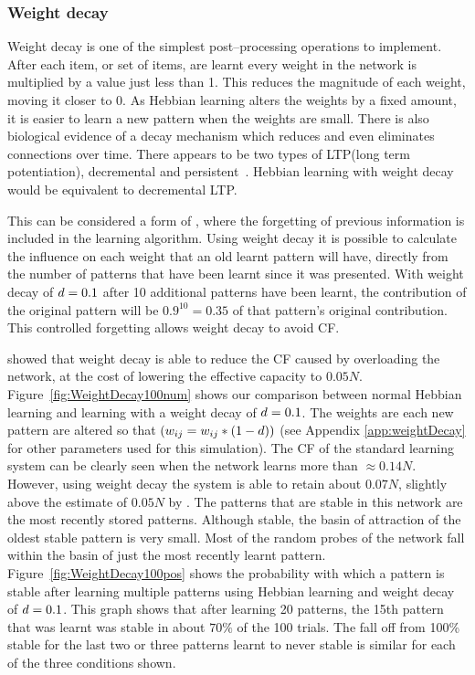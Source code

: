 
\subsubsection{Weight decay}

Weight decay is one of the simplest post--processing operations to implement.  After each item, or set of items, are learnt every weight in the network is multiplied by a value just less than 1.  This reduces the magnitude of each weight, moving it closer to 0.  As Hebbian learning alters the weights by a fixed amount, it is easier to learn a new pattern when the weights are small.   There is also biological evidence of a decay mechanism which reduces and even eliminates connections over time.  There appears to be two types of LTP(long term potentiation), decremental and persistent~\citep{Abraham2003}.  Hebbian learning with weight decay would be equivalent to decremental LTP.  

This can be considered a form of , where the forgetting of previous information is included in the learning algorithm.  Using weight decay it is possible to calculate the influence on each weight that an old learnt pattern will have, directly from the number of patterns that have been learnt since it was presented.  With weight decay of $d = 0.1$ after 10 additional patterns have been learnt, the contribution of the original pattern will be $0.9^{10} = 0.35$ of that pattern's original contribution.  This controlled forgetting allows weight decay to avoid CF. 

\citet{Christos1996} showed that weight decay is able to reduce the CF caused by overloading the network, at the cost of lowering the effective capacity to $0.05N$.  Figure~\ref{fig:WeightDecay100num} shows our comparison between normal Hebbian learning and learning with a weight decay of $d = 0.1$. The weights are each new pattern are altered so that $( w_{ij} = w_{ij}*(1-d))$ (see Appendix \ref{app:weightDecay} for other parameters used for this simulation).  The CF of the standard learning system can be clearly seen when the network learns more than $\approx 0.14N$.  However, using weight decay the system is able to retain about $0.07N$, slightly above the estimate of $0.05N$ by \citet{Nadal1986}.  The patterns that are stable in this network are the most recently stored patterns.  Although stable, the basin of attraction of the oldest stable pattern is very small. Most of the random probes of the network fall within the basin of just the most recently learnt pattern.  Figure~\ref{fig:WeightDecay100pos} shows the probability with which a pattern is stable after learning multiple patterns using Hebbian learning and weight decay of $d = 0.1$. This graph shows that after learning 20 patterns, the 15th pattern that was learnt was stable in about $70\%$ of the 100 trials. The fall off from 100\% stable for the last two or three patterns learnt to never stable is similar for each of the three conditions shown. 

